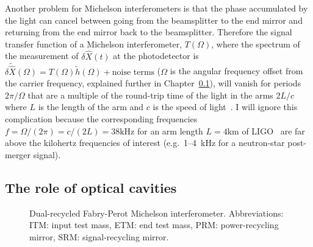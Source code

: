 Another problem for Michelson interferometers is that the phase accumulated by the light can cancel between going from the beamsplitter to the end mirror and returning from the end mirror back to the beamsplitter.
Therefore the signal transfer function of a Michelson interferometer, $T(\Omega)$, where the spectrum of the measurement of $\delta\hat{X}(t)$ at the photodetector is $\delta\tilde{\hat{X}}(\Omega) = T(\Omega) \tilde{h}(\Omega) + \text{noise terms}$ ($\Omega$ is the angular frequency offset from the carrier frequency, explained further in Chapter~\ref{}), will vanish for periods $2\pi/\Omega$ that are a multiple of the round-trip time of the light in the arms $2L/c$ where $L$ is the length of the arm and $c$ is the speed of light~\cite{}. 
I will ignore this complication because the corresponding frequencies $f=\Omega/(2\pi)=c/(2L)=38\mathrm{kHz}$ for an arm length $L=4\mathrm{km}$ of LIGO~\cite{} are far above the kilohertz frequencies of interest (e.g.\ 1--4~kHz for a neutron-star post-merger signal).

\subsection{The role of optical cavities}

\begin{figure}
	\centering
	\caption{Dual-recycled Fabry-Perot Michelson interferometer. Abbreviations: ITM: input test mass, ETM: end test mass, PRM: power-recycling mirror, SRM: signal-recycling mirror.}
	\label{fig:DRFPMI}
\end{figure}


